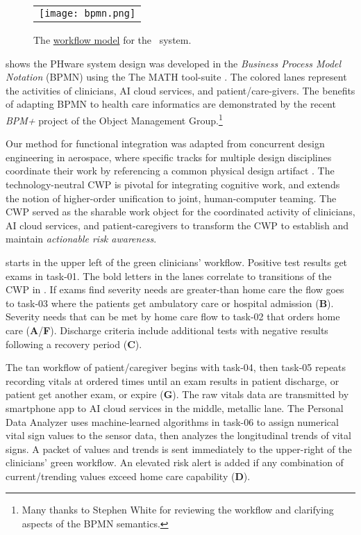 \begin{figure*}
  \begin{center}
    \begin{tabular}{c}
      \texttt{[image: bpmn.png]}
    \end{tabular}
  \end{center}
\caption{The \href{https://github.com/ericmercer/SPIN-bpmn-cwp-verification-paper/blob/main/26-Oct-2021-BPMN.png}{workflow model} for the \phware\ system.}
\label{fig:bpmn}
\end{figure*}

 shows the PHware system design was developed in the \emph{Business Process Model Notation} (BPMN) \cite{BPMN} \cite{BPMNSpecification} using the The MATH tool-suite \cite{workflowmodel}.
The colored lanes represent the activities of clinicians, AI cloud services, and patient/care-givers.
The benefits of adapting BPMN to health care informatics are demonstrated by the recent \emph{BPM+} project of the Object Management Group.\footnote{Many thanks to Stephen White for reviewing the workflow and clarifying aspects of the BPMN semantics.}

Our method for functional integration was adapted from concurrent design engineering in aerospace, where specific tracks for multiple design disciplines coordinate their work by referencing a common physical design artifact \cite{10.1007/978-1-4471-1538-0_9}.
The technology-neutral CWP is pivotal for integrating cognitive work, and extends the notion of higher-order unification \cite{10.1007/3-540-45685-6_2} to joint, human-computer teaming. The CWP served as the sharable work object for the coordinated activity of clinicians, AI cloud services, and patient-caregivers to transform the CWP to establish and maintain \emph{actionable risk awareness}.

 starts in the upper left of the green clinicians' workflow.
Positive test results get exams in task-01. The bold letters in the lanes correlate to transitions of the CWP in .
If exams find severity needs are greater-than home care the flow goes to task-03 where the patients get ambulatory care or hospital admission (\textbf{B}).
Severity needs that can be met by home care flow to task-02 that orders home care (\textbf{A}/\textbf{F}).
Discharge criteria include additional tests with negative results following a recovery period (\textbf{C}).

The tan workflow of patient/caregiver begins with task-04, then task-05 repeats recording vitals at ordered times until an exam results in patient discharge, or patient get another exam, or expire (\textbf{G}). 
The raw vitals data are transmitted by smartphone app to AI cloud services in the middle, metallic lane. The Personal Data Analyzer uses machine-learned algorithms in task-06 to assign numerical vital sign values to the sensor data, then analyzes the longitudinal trends of vital signs.
A packet of values and trends is sent immediately to the upper-right of the clinicians' green workflow. An elevated risk alert is added if any combination of current/trending values exceed home care capability (\textbf{D}).

